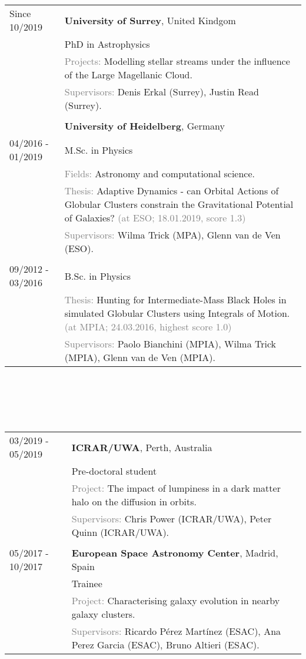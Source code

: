 \documentclass[a4paper,10pt,oneside]{article}
\begin{document}
\noindent \begin{tabular}{@{}p{3.3cm}@{}@{}p{12.5cm}@{}}
Since 10/2019& \textbf{University of Surrey}, United Kindgom \\
& PhD in Astrophysics \\
&\textcolor{gray}{Projects:} Modelling stellar streams under the influence of the Large Magellanic Cloud. \\
&\textcolor{gray}{Supervisors:} Denis Erkal (Surrey), Justin Read (Surrey). \\
& \\
& \textbf{University of Heidelberg}, Germany \\
04/2016 - 01/2019& M.Sc. in Physics \\
& \textcolor{gray}{Fields:} Astronomy and computational science.  \\
& \textcolor{gray}{Thesis:} Adaptive Dynamics - can Orbital Actions of Globular Clusters constrain the Gravitational Potential of Galaxies? \textcolor{gray}{(at ESO; 18.01.2019, score 1.3)}\\
& \textcolor{gray}{Supervisors:} Wilma Trick (MPA), Glenn van de Ven (ESO).\\
& \\
09/2012 - 03/2016 & B.Sc. in Physics\\
& \textcolor{gray}{Thesis:} \color{black}Hunting for Intermediate-Mass Black Holes in simulated Globular Clusters using Integrals of Motion. \textcolor{gray}{(at MPIA; 24.03.2016, highest score 1.0)}\\ 
&  \textcolor{gray}{Supervisors:} Paolo Bianchini (MPIA), Wilma Trick (MPIA), Glenn van de Ven (MPIA).\\
\end{tabular}\\
\\
\\
\smallskip \\
\noindent \begin{tabular}{@{}p{3.3cm}@{}@{}p{12.5cm}@{}}
03/2019 - 05/2019&\textbf{ICRAR/UWA}, Perth, Australia\\
&Pre-doctoral student\\
& \textcolor{gray}{Project:} The impact of lumpiness in a dark matter halo on the diffusion in orbits.\\
& \textcolor{gray}{Supervisors:} Chris Power (ICRAR/UWA), Peter Quinn (ICRAR/UWA). \\
&\\
05/2017 - 10/2017& \textbf{European Space Astronomy Center}, Madrid, Spain \\
& Trainee \\
& \textcolor{gray}{Project:} Characterising galaxy evolution in nearby galaxy clusters.\\
& \textcolor{gray}{Supervisors:} Ricardo Pérez Martínez (ESAC), Ana Perez Garcia (ESAC), Bruno Altieri (ESAC). \\
\end{tabular}\\
\end{document}
